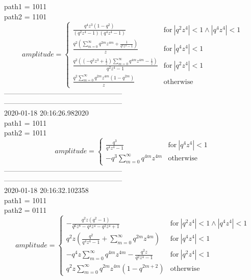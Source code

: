 \documentclass{jsreport}
\begin{document}
path1 = 1011\\
path2 = 1101\\
$$amplitude = \begin{cases} \frac{q^{4} z^{3} \left(1 - q^{2}\right)}{\left(q^{2} z^{4} - 1\right) \left(q^{4} z^{4} - 1\right)} & \text{for}\: \left|{q^{2} z^{4}}\right| < 1 \wedge \left|{q^{4} z^{4}}\right| < 1 \\\frac{q^{2} \left(\sum_{m=0}^{\infty} q^{2 m} z^{4 m} + \frac{1}{q^{4} z^{4} - 1}\right)}{z} & \text{for}\: \left|{q^{4} z^{4}}\right| < 1 \\\frac{q^{2} \left(\left(- q^{2} z^{3} + \frac{1}{z}\right) \sum_{m=0}^{\infty} q^{4 m} z^{4 m} - \frac{1}{z}\right)}{q^{2} z^{4} - 1} & \text{for}\: \left|{q^{2} z^{4}}\right| < 1 \\\frac{q^{2} \sum_{m=0}^{\infty} q^{2 m} z^{4 m} \left(1 - q^{2 m}\right)}{z} & \text{otherwise} \end{cases}$$
--------------------------------------------------\\
--------------------------------------------------\\
2020-01-18 20:16:26.982020\\
path1 = 1011\\
path2 = 1011\\
$$amplitude = \begin{cases} \frac{q^{3}}{q^{4} z^{4} - 1} & \text{for}\: \left|{q^{4} z^{4}}\right| < 1 \\- q^{3} \sum_{m=0}^{\infty} q^{4 m} z^{4 m} & \text{otherwise} \end{cases}$$
--------------------------------------------------\\
--------------------------------------------------\\
2020-01-18 20:16:32.102358\\
path1 = 1011\\
path2 = 0111\\
$$amplitude = \begin{cases} - \frac{q^{2} z \left(q^{2} - 1\right)}{q^{6} z^{8} - q^{4} z^{4} - q^{2} z^{4} + 1} & \text{for}\: \left|{q^{2} z^{4}}\right| < 1 \wedge \left|{q^{4} z^{4}}\right| < 1 \\q^{2} z \left(\frac{q^{2}}{q^{4} z^{4} - 1} + \sum_{m=0}^{\infty} q^{2 m} z^{4 m}\right) & \text{for}\: \left|{q^{4} z^{4}}\right| < 1 \\- q^{4} z \sum_{m=0}^{\infty} q^{4 m} z^{4 m} - \frac{q^{2} z}{q^{2} z^{4} - 1} & \text{for}\: \left|{q^{2} z^{4}}\right| < 1 \\q^{2} z \sum_{m=0}^{\infty} q^{2 m} z^{4 m} \left(1 - q^{2 m + 2}\right) & \text{otherwise} \end{cases}$$
\end{document}
